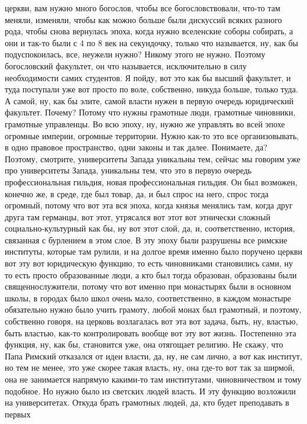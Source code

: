церкви, вам нужно много богослов, чтобы все богословствовали, что-то там меняли,
изменяли, чтобы как можно больше были дискуссий всяких разного рода, чтобы снова
вернулась эпоха, когда нужно вселенские соборы собирать, а они и так-то были с 4
по 8 век на секундочку, только что называется, ну, как бы подуспокоилась, все,
неужели нужно? Никому этого не нужно. Поэтому богословский факультет, он что
называется, исключительно в силу необходимости самих студентов. Я пойду, вот это
как бы высший факультет, и туда поступали уже вот просто по воле, собственно,
никуда больше, только туда. А самой, ну, как бы элите, самой власти нужен в
первую очередь юридический факультет. Почему? Потому что нужны грамотные люди,
грамотные чиновники, грамотные управленцы. Во всю эпоху, ну, нужно же управлять
во всей эпохе огромные империи, огромные территории. Нужно как-то это все
организовывать, в одно правовое пространство, одни законы и так далее.
Понимаете, да? Поэтому, смотрите, университеты Запада уникальны тем, сейчас мы
говорим уже про университеты Запада, уникальны тем, что это в первую очередь
профессиональная гильдия, новая профессиональная гильдия. Он был возможен,
конечно же, в среде, где был товар, да, и был спрос на него, спрос тогда
огромный, потому что вот эта вся эпоха, когда князья менялись там, когда друг
друга там германцы, вот этот, утрясался вот этот вот этнически сложный
социально-культурный как бы, ну вот этот слой, да, и, соответственно, история,
связанная с бурлением в этом слое. В эту эпоху были разрушены все римские
институты, которые там рулили, и на долгое время именно было поручено церкви вот
эту вот юридическую функцию, то есть чиновниками становились сами, ну то есть
просто образованные люди, а кто был тогда образован, образованы были
священнослужители, потому что вот именно при монастырях были в основном школы, в
городах было школ очень мало, соответственно, в каждом монастыре обязательно
нужно было учить грамоту, любой монах был грамотный, и поэтому, собственно
говоря, на церковь возлагалась вот эта вот задача, быть, ну, властью, быть
властью, как-то контролировать вообще вот эту вот жизнь. Постепенно эта функция,
ну, как бы, становится уже, она отягощает религию. Не скажу, что Папа Римский
отказался от идеи власти, да, ну, не сам лично, а вот как институт, но тем не
менее, это уже скорее такая власть, ну, она где-то вот так за ширмой, она не
занимается напрямую какими-то там институтами, чиновничеством и тому подобное.
Но нужно было из светских людей власть. И эту функцию возложили на
университетах. Откуда брать грамотных людей, да, кто будет преподавать в первых
